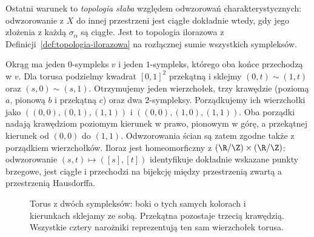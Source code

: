 Ostatni warunek to \emph{topologia słaba}
względem odwzorowań charakterystycznych:
odwzorowanie z $X$ do innej przestrzeni
jest ciągłe dokładnie wtedy, gdy jego
złożenia z każdą $\sigma_\alpha$ są ciągłe.
Jest to topologia ilorazowa z
Definicji~\ref{def:topologia-ilorazowa}
na rozłącznej sumie wszystkich sympleksów.

\begin{przyklad}
\label{prz:delta-torus}
Okrąg ma jeden $0$-sympleks $v$
i jeden $1$-sympleks, którego oba końce
przechodzą w $v$. Dla torusa
podzielmy kwadrat $[0,1]^2$
przekątną i sklejmy
$(0,t)\sim(1,t)$ oraz
$(s,0)\sim(s,1)$. Otrzymujemy
jeden wierzchołek, trzy krawędzie
(poziomą $a$, pionową $b$ i przekątną
$c$) oraz dwa $2$-sympleksy. Porządkujemy ich wierzchołki jako
$((0,0),(0,1),(1,1))$ i $((0,0),(1,0),(1,1))$.
Oba porządki nadają krawędziom poziomym kierunek w prawo,
pionowym w górę, a przekątnej kierunek od $(0,0)$ do $(1,1)$.
Odwzorowania ścian są zatem zgodne także z porządkiem wierzchołków.
Iloraz jest homeomorficzny z
$(\R/\Z)\times(\R/\Z)$:
odwzorowanie $(s,t)\mapsto([s],[t])$
identyfikuje dokładnie wskazane
punkty brzegowe, jest ciągłe
i przechodzi na bijekcję
między przestrzenią zwartą
a przestrzenią Hausdorffa.
\end{przyklad}

\begin{figure}[!htbp]
\centering
{}
\caption{Torus z dwóch sympleksów: boki o tych samych
kolorach i kierunkach sklejamy ze sobą. Przekątna
pozostaje trzecią krawędzią. Wszystkie cztery narożniki
reprezentują ten sam wierzchołek torusa.}
\label{fig:delta-torus}
\end{figure}

